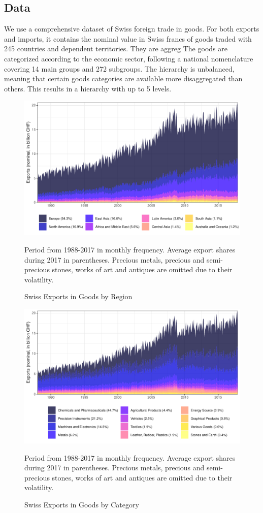 \documentclass[a4paper,fleqn,11pt]{article}
\begin{document}
\subsection{Data}
We use a comprehensive dataset of Swiss foreign trade in goods. For both exports and imports, it contains the nominal value in Swiss francs of goods traded with 245 countries and dependent territories. They are aggreg The goods are categorized according to the economic sector, following a national nomenclature covering 14 main groups and 272 subgroups. The hierarchy is unbalanced, meaning that certain goods categories are available more disaggregated than others. This results in a hierarchy with up to 5 levels.
\begin{figure}[H]
	\includegraphics[width=\textwidth]{fig/fig_area_reg}
	\caption{Swiss Exports in Goods by Region}
	\footnotesize{Period from 1988-2017 in monthly frequency. Average export shares during 2017 in parentheses. Precious metals, precious and semi-precious stones, works of art and antiques are omitted due to their volatility.}
\end{figure}

\begin{figure}[H]
	\includegraphics[width=\textwidth]{fig/fig_area_cat}
	\caption{Swiss Exports in Goods by Category}
	\footnotesize{Period from 1988-2017 in monthly frequency. Average export shares during 2017 in parentheses. Precious metals, precious and semi-precious stones, works of art and antiques are omitted due to their volatility.}
\end{figure}
\end{document}
